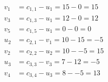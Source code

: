 \[
\begin{aligned}
v_{1} &= c_{1,1} - u_{1} = 15 - 0 = 15 \\
v_{3} &= c_{1,3} - u_{1} = 12 - 0 = 12 \\
v_{5} &= c_{1,5} - u_{1} = 0 - 0 = 0 \\
u_{2} &= c_{2,1} - v_{1} = 10 - 15 = -5 \\
v_{2} &= c_{2,2} - u_{2} = 10 - -5 = 15 \\
u_{3} &= c_{3,3} - v_{3} = 7 - 12 = -5 \\
v_{4} &= c_{3,4} - u_{3} = 8 - -5 = 13 \\
\end{aligned}
\]

